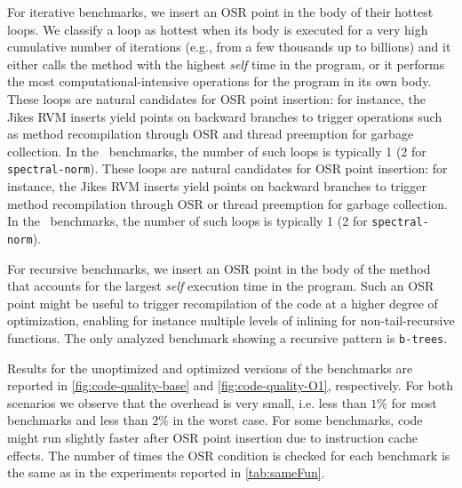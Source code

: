 \begin{description}
For iterative benchmarks, we insert an OSR point in the body of their hottest loops. We classify a loop as hottest when its body is executed for a very high cumulative number of iterations (e.g., from a few thousands up to billions) and it either calls the method with the highest {\em self} time in the program, or it performs the most computational-intensive operations for the program in its own body.
\ifdefined \fullver
These loops are natural candidates for OSR point insertion: for instance, the Jikes RVM inserts yield points on backward branches to trigger operations such as method recompilation through OSR and thread preemption for garbage collection. In the \shootout\ benchmarks, the number of such loops is typically 1 (2 for {\tt spectral-norm}).
\else
These loops are natural candidates for OSR point insertion: for instance, the Jikes RVM inserts yield points on backward branches to trigger method recompilation through OSR or thread preemption for garbage collection. In the \shootout\ benchmarks, the number of such loops is typically 1 (2 for {\tt spectral-norm}).
\fi

For recursive benchmarks, we insert an OSR point in the body of the method that accounts for the largest {\em self} execution time in the program. Such an OSR point might be useful to trigger recompilation of the code at a higher degree of optimization, enabling for instance multiple levels of inlining for non-tail-recursive functions. The only analyzed benchmark showing a recursive pattern is {\tt b-trees}.


Results for the unoptimized and optimized versions of the benchmarks are reported in \myfigure\ref{fig:code-quality-base} and \myfigure\ref{fig:code-quality-O1}, respectively. For both scenarios we observe that the overhead is very small, i.e. less than $1\%$ for most benchmarks and less than $2\%$ in the worst case. For some benchmarks, code might run slightly faster after OSR point insertion due to instruction cache effects.
The number of times the OSR condition is checked for each benchmark is the same as in the experiments reported in \mytable\ref{tab:sameFun}.


\end{description}
